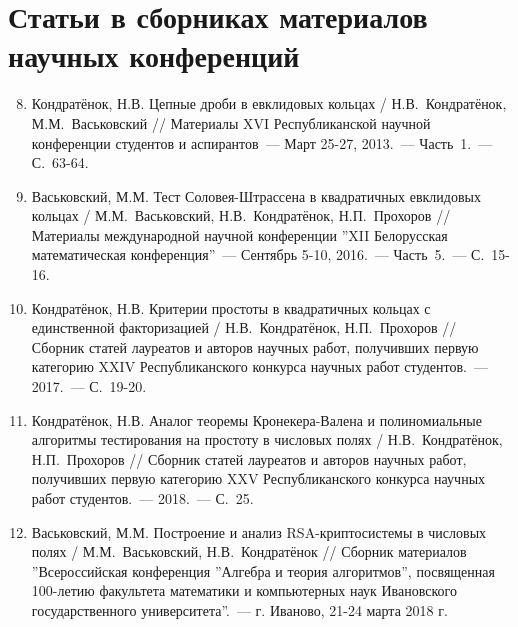 \vspace{-4ex}
\section*{\fontsize{14}{15}\selectfont Статьи в сборниках материалов научных конференций}
\vspace{-4ex}

\begin{enumerate}
\setcounter{enumi}{7}

    \item \label{source:Republican_Scientific_Conference_of_Students_and_Postgraduates_2013}
    Кондратёнок, Н.В. Цепные дроби в евклидовых кольцах / Н.В.~Кондратёнок, М.М.~Васьковский // Материалы XVI Республиканской научной конференции студентов и аспирантов~--- Март 25-27, 2013.~--- Часть~1.~--- С.~63-64.

    \item \label{source:XII_Belarussian_math_conference_2016}
    Васьковский, М.М. Тест Соловея-Штрассена в квадратичных евклидовых кольцах / М.М.~Васьковский, Н.В.~Кондратёнок, Н.П.~Прохоров // Материалы международной научной конференции ''XII Белорусская математическая конференция''~--- Сентябрь 5-10, 2016.~--- Часть~5.~--- С.~15-16.

    \item \label{source:Collection_of_articles_by_laureates_2017}
    Кондратёнок, Н.В. Критерии простоты в квадратичных кольцах с единственной факторизацией / Н.В.~Кондратёнок, Н.П.~Прохоров // Сборник статей лауреатов и авторов научных работ, получивших первую категорию XXIV Республиканского конкурса научных работ студентов.~--- 2017.~--- С.~19-20.

    \item \label{source:Collection_of_articles_by_laureates_2018}
    Кондратёнок, Н.В. Аналог теоремы Кронекера-Валена и полиномиальные алгоритмы тестирования на простоту в числовых полях / Н.В.~Кондратёнок, Н.П.~Прохоров // Сборник статей лауреатов и авторов научных работ, получивших первую категорию XXV Республиканского конкурса научных работ студентов.~--- 2018.~--- С.~25.

    \item \label{source:Algebra_and_theory_of_algorithms}
    Васьковский, М.М. Построение и анализ RSA-криптосистемы в числовых полях / М.М.~Васьковский, Н.В.~Кондратёнок // Сборник материалов ''Всероссийская конференция ''Алгебра и теория алгоритмов'', посвященная 100-летию факультета математики и компьютерных наук Ивановского государственного университета''.~--- г. Иваново, 21-24 марта 2018 г.


\end{enumerate}
